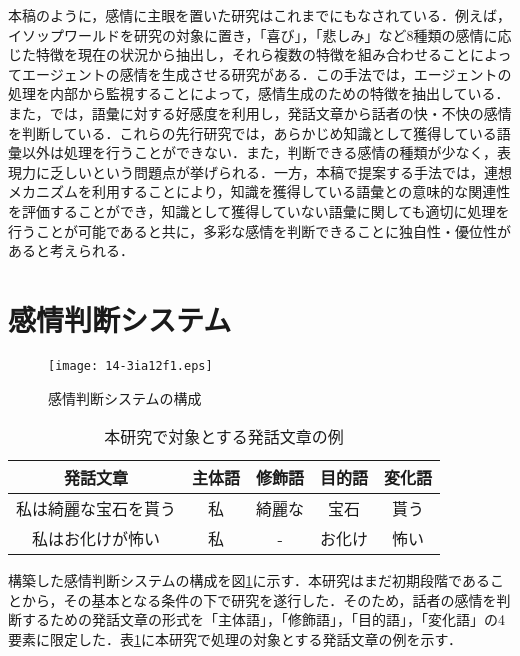 \documentclass[japanese]{jnlp_1.3a}
\begin{document}
本稿のように，感情に主眼を置いた研究はこれまでにもなされている．例えば，イソップワールドを研究の対象に置き，「喜び」，「悲しみ」など8種類の感情に応じた特徴を現在の状況から抽出し，それら複数の特徴を組み合わせることによってエージェントの感情を生成させる研究がある\cite{okada:92,okada:96,tokuhisa:98}．この手法では，エージェントの処理を内部から監視することによって，感情生成のための特徴を抽出している．また，\cite{mera:02}では，語彙に対する好感度を利用し，発話文章から話者の快・不快の感情を判断している．これらの先行研究では，あらかじめ知識として獲得している語彙以外は処理を行うことができない．また，判断できる感情の種類が少なく，表現力に乏しいという問題点が挙げられる．一方，本稿で提案する手法では，連想メカニズムを利用することにより，知識を獲得している語彙との意味的な関連性を評価することができ，知識として獲得していない語彙に関しても適切に処理を行うことが可能であると共に，多彩な感情を判断できることに独自性・優位性があると考えられる．


\section{感情判断システム}\label{system}


\begin{figure}[b]
\begin{center}
    \texttt{[image: 14-3ia12f1.eps]}
\end{center}
\caption{感情判断システムの構成}
\label{emotion_judgment_system}
\end{figure}

\begin{table}[b]
\caption{本研究で対象とする発話文章の例}
\label{example_of_hatsuwabunnshou}
\begin{center}
\begin{tabular}{|c|c|c|c|c|} \hline
発話文章 & 主体語 & 修飾語 & 目的語 & 変化語 \\ \hline\hline
私は綺麗な宝石を貰う & 私 & 綺麗な & 宝石 & 貰う \\ \hline
私はお化けが怖い & 私 & - & お化け & 怖い \\ \hline
\end{tabular}
\end{center}
\end{table}

構築した感情判断システムの構成を図\ref{emotion_judgment_system}に示す．本研究はまだ初期段階であることから，その基本となる条件の下で研究を遂行した．そのため，話者の感情を判断するための発話文章の形式を「主体語」，「修飾語」，「目的語」，「変化語」の4要素に限定した．表\ref{example_of_hatsuwabunnshou}に本研究で処理の対象とする発話文章の例を示す．
\end{document}
